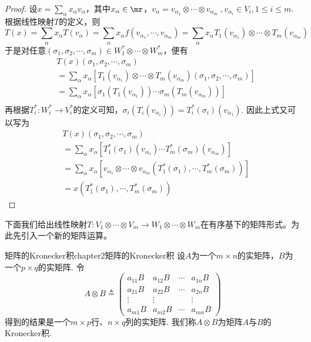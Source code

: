 \begin{proof}
	设$x=\sum\limits_{ \alpha }x_{\alpha}v_{\alpha}$，其中$x_{\alpha}\in \mr$，$v_{\alpha}=v_{\alpha_{1}}\otimes\cdots\otimes v_{\alpha_{ m }}\;,v_{\alpha_{ i }}\in V_{i},1\leqslant i\leqslant m$. 根据线性映射$T$的定义，则
	\[
	T(x)=\sum\limits_{ \alpha }x_{\alpha}T\left(v_{\alpha}\right)=\sum\limits_{ \alpha }x_{\alpha}f(v_{\alpha_{1}},\cdots, v_{\alpha_{ m }})=\sum\limits_{ \alpha }x_{\alpha}T_{1}(v_{\alpha_{ 1 }})\otimes\cdots\otimes T_{m}(v_{\alpha_{ m }})
	\]
	于是对任意$\left(\sigma_{1},\sigma_{2},\cdots,\sigma_{m} \right)\in W^{\ast}_{1}\otimes\cdots\otimes W^{\ast}_{m}$，便有
	\[
	\begin{split}
	&T(x)\left(\sigma_{1},\sigma_{2},\cdots,\sigma_{m} \right)\\
	&=\sum\limits_{ \alpha }x_{\alpha}\left[T_{1}(v_{\alpha_{ 1 }})\otimes\cdots\otimes T_{m}(v_{\alpha_{ m }})\left(\sigma_{1},\sigma_{2},\cdots,\sigma_{m} \right)\right]\\
	&=\sum\limits_{ \alpha }x_{\alpha}\left[\sigma_{1}\left(T_{1}(v_{\alpha_{ 1 }})\right)\cdots\sigma_{m}\left(T_{m}(v_{\alpha_{ m }})\right)\right]\\
	\end{split}
	\]
	再根据$T_{i}^{\ast}:W^{\ast}_{i}\longrightarrow V^{\ast}_{i}$的定义可知，$\sigma_{i}\left(T_{i}(v_{\alpha_{i }})\right)=T^{\ast}_{i}(\sigma_{i})(v_{\alpha_{ 1 }})$. 因此上式又可以写为
	\[
	\begin{split}
	&T(x)\left(\sigma_{1},\sigma_{2},\cdots,\sigma_{m} \right)\\
	&=\sum\limits_{ \alpha }x_{\alpha}\left[T^{\ast}_{1}(\sigma_{1})(v_{\alpha_{ 1 }})\cdots T^{\ast}_{m}(\sigma_{m})(v_{\alpha_{ m }})\right]\\
	&=\sum\limits_{ \alpha }x_{\alpha}\left[v_{\alpha_{1}}\otimes\cdots\otimes v_{\alpha_{ m }}\left(T^{\ast}_{1}(\sigma_{1}),\cdots,T^{\ast}_{m}(\sigma_{m}) \right) \right]\\
	&=x\left(T^{\ast}_{1}(\sigma_{1}),\cdots,T^{\ast}_{m}(\sigma_{m}) \right)
	\end{split}
	\]
\end{proof}

下面我们给出线性映射$T:V_{1}\otimes\cdots\otimes V_{m}\longrightarrow W_{1}\otimes\cdots\otimes W_{m}$在有序基下的矩阵形式。为此先引入一个新的矩阵运算。
\begin{mydef}{矩阵的Kronecker积}{chapter2矩阵的Kronecker积}
	设$A$为一个$m\times n$的实矩阵，$B$为一个$p\times q$的实矩阵. 令
	\[
	A\otimes B\triangleq \left( \begin{array}{cccc}{a_{11}B} & {a_{12}B} & {\cdots} & {a_{1 n}B} \\ {a_{21}B} & {a_{22}B} & {\cdots} & {a_{2 n}B} \\ {\vdots} & {\vdots} & { } & {\vdots} \\ {a_{m 1}B} & {a_{m 2}B} & {\cdots} & {a_{m n}B}\end{array}\right)
	\]
    得到的结果是一个$m\times p$行、$n\times q$列的实矩阵. 我们称$A\otimes B$为矩阵$A$与$B$的Kronecker积.
\end{mydef}

